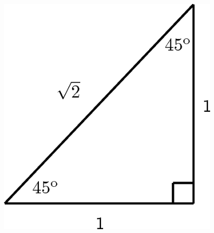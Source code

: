 \begin{enumerate}[noitemsep, label=\textbf{\arabic*}. ]
	\begin{figure}[H] %
    \begin{center}
    \label{m39408*id80587!!!underscore!!!media}\label{m39408*id80587!!!underscore!!!printimage}\includegraphics{col11306.imgs/m39408_MG10C15_007.png} %
        
      \vspace{2pt}
    \vspace{.1in}
    
    \end{center}

 \end{figure}   


\end{enumerate}
